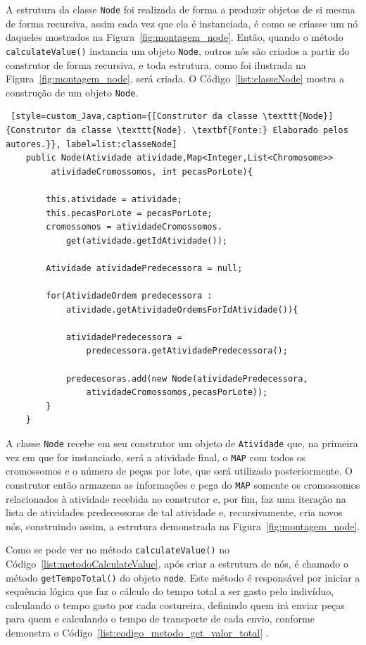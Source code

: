 \par A estrutura da classe \texttt{Node} foi realizada de forma a produzir objetos de si mesma de forma recursiva, assim 
cada vez que ela é instanciada, é como se criasse um nó daqueles mostrados na Figura~\ref{fig:montagem_node}. Então,
quando o método \texttt{calculateValue()} instancia um objeto \texttt{Node}, outros nós são criados a partir do construtor
de forma recursiva, e toda estrutura, como foi ilustrada na Figura~\ref{fig:montagem_node}, será criada. 
O Código~\ref{list:classeNode} mostra a construção de um objeto \texttt{Node}.

\begin{lstlisting} [style=custom_Java,caption={[Construtor da classe \texttt{Node}]
{Construtor da classe \texttt{Node}. \textbf{Fonte:} Elaborado pelos autores.}}, label=list:classeNode]
	public Node(Atividade atividade,Map<Integer,List<Chromosome>>
		 atividadeCromossomos, int pecasPorLote){
		
		this.atividade = atividade;
		this.pecasPorLote = pecasPorLote;
		cromossomos = atividadeCromossomos.
			get(atividade.getIdAtividade());
			
		Atividade atividadePredecessora = null;
		
		for(AtividadeOrdem predecessora : 
			atividade.getAtividadeOrdemsForIdAtividade()){
			
			atividadePredecessora = 
				predecessora.getAtividadePredecessora();
		
			predecesoras.add(new Node(atividadePredecessora,
				atividadeCromossomos,pecasPorLote));
		}
	}
\end{lstlisting}

\par A classe \texttt{Node} recebe em seu construtor um objeto de \texttt{Atividade} que, na primeira vez em que for instanciado,
será a atividade final, o \texttt{MAP} com todos os cromossomos e o número de peças por lote, que será utilizado posteriormente.
O construtor então armazena as informações e pega do \texttt{MAP} somente os cromossomos relacionados à atividade recebida no construtor e, 
por fim, faz uma iteração na lista de atividades predecessoras de tal atividade e, recursivamente, cria novos nós, 
construindo assim, a estrutura demonstrada na Figura~\ref{fig:montagem_node}.

\par Como se pode ver no método \texttt{calculateValue()} no Código~\ref{list:metodoCalculateValue}, após criar a estrutura de nós, é chamado o método \texttt{getTempoTotal()} do objeto \texttt{node}. Este método é responsável por iniciar a sequência lógica que 
faz o cálculo do tempo total a ser gasto pelo indivíduo, calculando o tempo gasto por 
cada costureira, definindo quem irá enviar peças para quem e calculando o tempo de transporte 
de cada envio, conforme demonstra o Código~\ref{list:codigo_metodo_get_valor_total} .

